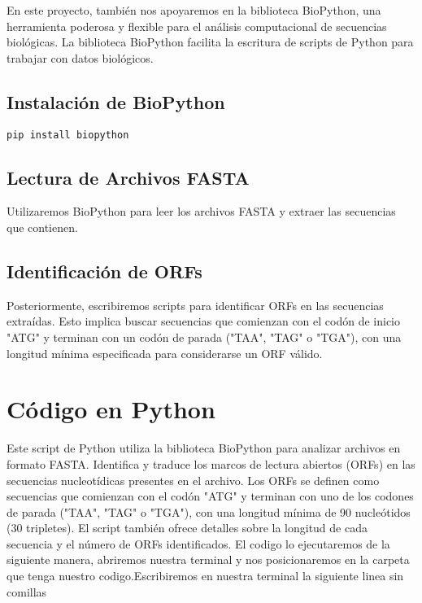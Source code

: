 En este proyecto, también nos apoyaremos en la biblioteca BioPython, una herramienta poderosa y flexible para el análisis computacional de secuencias biológicas. La biblioteca BioPython facilita la escritura de scripts de Python para trabajar con datos biológicos.

\subsection*{Instalación de BioPython}

\begin{verbatim}
pip install biopython
\end{verbatim}

\subsection*{Lectura de Archivos FASTA}

Utilizaremos BioPython para leer los archivos FASTA y extraer las secuencias que contienen.

\subsection*{Identificación de ORFs}

Posteriormente, escribiremos scripts para identificar ORFs en las secuencias extraídas. Esto implica buscar secuencias que comienzan con el codón de inicio "ATG" y terminan con un codón de parada ("TAA", "TAG" o "TGA"), con una longitud mínima especificada para considerarse un ORF válido.


\section*{Código en Python}

Este script de Python utiliza la biblioteca BioPython para analizar archivos en formato FASTA. Identifica y traduce los marcos de lectura abiertos (ORFs) en las secuencias nucleotídicas presentes en el archivo. Los ORFs se definen como secuencias que comienzan con el codón "ATG" y terminan con uno de los codones de parada ("TAA", "TAG" o "TGA"), con una longitud mínima de 90 nucleótidos (30 tripletes). El script también ofrece detalles sobre la longitud de cada secuencia y el número de ORFs identificados.
El codigo lo ejecutaremos de la siguiente manera, abriremos nuestra terminal y nos posicionaremos en la carpeta que tenga nuestro codigo.Escribiremos en nuestra terminal la siguiente linea sin comillas

